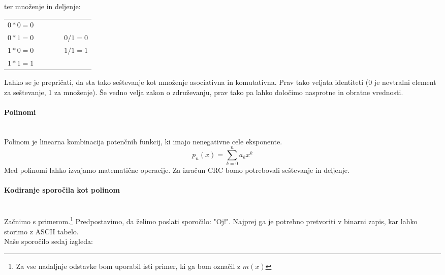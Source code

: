 \documentclass[12pt]{article}
\begin{document}
                ter množenje in deljenje:
                \begin{table}[h!]
                    \centering
                    \begin{tabular}{l p{0.2\linewidth}}
                        $0 * 0 = 0$  &  \\
                        $0 * 1 = 0$  & $0 / 1 = 0$\\
                        $1 * 0 = 0$  & $1 / 1 = 1$\\
                        $1 * 1 = 1$  &  \\
                    \end{tabular}
                \end{table}

                Lahko se je prepričati, da sta tako seštevanje kot množenje
                asociativna in komutativna. Prav tako veljata identiteti (0 je 
                nevtralni element za seštevanje, 1 za množenje). Še vedno velja 
                zakon o združevanju, prav tako pa lahko določimo nasprotne in 
                obratne vrednosti. 
            
            \paragraph{Polinomi} \mbox{}\\
                Polinom je linearna kombinacija potenčnih funkcij, ki imajo 
                nenegativne cele eksponente.
                \begin{equation}
                    p_n (x) = \sum_{k=0}^n a_kx^k
                \end{equation}
                Med polinomi lahko izvajamo matematične operacije. Za izračun
                CRC bomo potrebovali seštevanje in deljenje. 
            
            \paragraph{Kodiranje sporočila kot polinom} \mbox{}\\
                Začnimo s primerom.\footnote{Za vse nadaljnje odstavke bom 
                uporabil isti primer, ki ga bom označil z $m(x)$} 
                Predpostavimo, da želimo poslati sporočilo: "Oj!". Najprej ga je
                potrebno pretvoriti v binarni zapis, kar lahko storimo z ASCII
                tabelo.\\
                Naše sporočilo sedaj izgleda:
\end{document}
